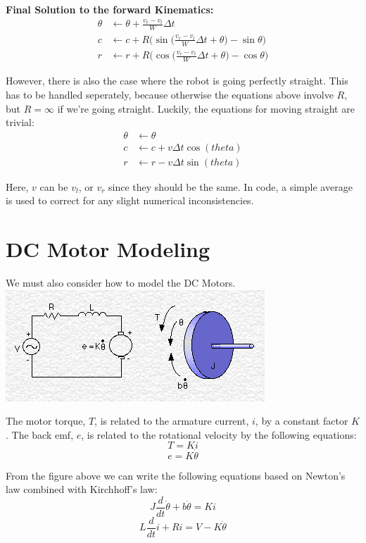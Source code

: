 \documentclass{article}
\begin{document}
\textbf{Final Solution to the forward Kinematics:}
\begin{align}
 \theta &\leftarrow \theta + \frac{v_r-v_l}{W}\Delta t \\
  c &\leftarrow c + R\Bigg(\sin{\Big(\frac{v_r-v_l}{W}\Delta t+\theta\Big)}-\sin{\theta}\Bigg) \\
  r &\leftarrow r + R\Bigg(\cos{\Big(\frac{v_r-v_l}{W}\Delta t+\theta\Big)}-\cos{\theta}\Bigg)
\end{align}

However, there is also the case where the robot is going perfectly straight. This has to be handled seperately, because otherwise the equations above involve $R$, but $R=\infty$ if we're going straight. Luckily, the equations for moving straight are trivial:
\begin{align}
 \theta &\leftarrow \theta \\
  c &\leftarrow c + v\Delta t\cos(theta) \\
  r &\leftarrow r - v\Delta t\sin(theta)
\end{align}

Here, $v$ can be $v_l$, or $v_r$ since they should be the same. In code, a simple average is used to correct for any slight numerical inconsistencies. \\

\section{DC Motor Modeling}
We must also consider how to model the DC Motors. \\

\includegraphics[scale=0.5]{./dc_motor_model.png}

The motor torque, $T$, is related to the armature current, $i$, by a constant factor $K$. The back emf, $e$, is related to the rotational velocity by the following equations:
$$T=Ki$$
$$e=K\dot{\theta}$$

From the figure above we can write the following equations based on Newton's law combined with Kirchhoff's law:
$$J\frac{d}{dt}\dot{\theta} + b\dot{\theta} = Ki$$
$$L\frac{d}{dt}i+Ri=V-K\dot{\theta}$$
\end{document}
